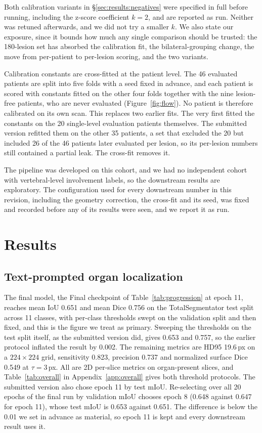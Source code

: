 \documentclass[10pt]{article}
\begin{document}
Both calibration variants in \S\ref{sec:results:negatives} were specified in full
before running, including the z-score coefficient $k=2$, and are reported as run.
Neither was retuned afterwards, and we did not try a smaller $k$. We also state
our exposure, since it bounds how much any single comparison should be trusted:
the 180-lesion set has absorbed the calibration fit, the bilateral-grouping
change, the move from per-patient to per-lesion scoring, and the two variants.

Calibration constants are cross-fitted at the patient level. The 46 evaluated
patients are split into five folds with a seed fixed in advance, and each
patient is scored with constants fitted on the other four folds together with the
nine lesion-free patients, who are never evaluated (Figure~\ref{fig:flow}). No
patient is therefore calibrated on its own scan. This replaces two earlier fits.
The very first fitted the constants on the 20 single-level evaluation patients
themselves. The submitted version refitted them on the other 35 patients, a set that excluded the 20 but included 26 of the 46 patients later evaluated per lesion,
so its per-lesion numbers still contained a partial leak. The cross-fit removes it.

The pipeline was developed on this cohort, and we had no independent cohort with
vertebral-level involvement labels, so the downstream results are exploratory. The
configuration used for every downstream number in this revision, including the
geometry correction, the cross-fit and its seed, was fixed and recorded before any
of its results were seen, and we report it as run.

\section{Results}
\label{sec:results}

\subsection{Text-prompted organ localization}
\label{sec:results:phase1}

The final model, the Final checkpoint of Table~\ref{tab:progression} at epoch 11,
reaches mean IoU 0.651 and mean Dice 0.756 on the TotalSegmentator test split
across 11 classes, with per-class thresholds swept on the validation split and
then fixed, and this is the figure we treat as primary. Sweeping the thresholds on the
test split itself, as the submitted version did, gives 0.653 and 0.757, so the
earlier protocol inflated the result by 0.002. The remaining metrics are HD95
19.6\,px on a $224\times224$ grid, sensitivity 0.823, precision 0.737 and
normalized surface Dice 0.549 at $\tau=3$\,px. All are 2D per-slice metrics on
organ-present slices, and Table~\ref{tab:overall} in Appendix~\ref{app:overall}
gives both threshold protocols. The submitted version also chose epoch 11 by test
mIoU. Re-selecting over all 20 epochs of the final run by validation mIoU chooses
epoch 8 (0.648 against 0.647 for epoch 11), whose test mIoU is 0.653 against
0.651. The difference is below the 0.01 we set in advance as material, so epoch 11
is kept and every downstream result uses it.
\end{document}
